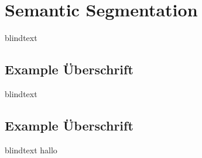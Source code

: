 \section{Semantic Segmentation}
\label{sec:SemanticSegmentation}

blindtext

\subsection{Example Überschrift}

blindtext

\subsection{Example Überschrift}

blindtext hallo